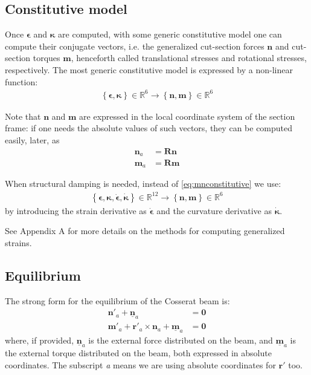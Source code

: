 \documentclass[review]{elsarticle}
\def\avect#1{{\boldsymbol{#1}}}
\def\amatr#1{{\boldsymbol{#1}}}
\begin{document}
\subsection{Constitutive model}

Once $\avect{\epsilon}$ and $\avect{\kappa}$ are computed, with some generic constitutive model one can compute their conjugate vectors, i.e. the generalized cut-section forces $\avect{n}$ and cut-section torques $\avect{m}$, henceforth called translational stresses and rotational stresses, respectively.
The most generic constitutive model is expressed by a non-linear function:
%
\begin{align}
  \left\{  
	 \avect{\epsilon},
	 \avect{\kappa}
	\right\} \in \mathbb{R}^6
	\rightarrow
	\left\{  
	 \avect{n},
	 \avect{m} 
	\right\} \in \mathbb{R}^6
\label{eq:mnconstitutive}
\end{align}

Note that $\avect{n}$ and $\avect{m}$ are expressed in the local coordinate system of the section frame: if one
needs the absolute values of such vectors, they can be computed easily, later, as 
\begin{align}
\avect{n}_a &= \amatr{R}\avect{n}\\ 
\avect{m}_a &= \amatr{R}\avect{m}
\end{align}

When structural damping is needed, instead of \eqref{eq:mnconstitutive} we use:
%
\begin{align}
  \left\{  
	 \avect{\epsilon},
	 \avect{\kappa},
	 \dot{\avect{\epsilon}},
	 \dot{\avect{\kappa}}
	\right\} \in \mathbb{R}^{12}
	\rightarrow
	\left\{  
	 \avect{n},
	 \avect{m} 
	\right\} \in \mathbb{R}^6
\label{eq:mnconstitutivewdamping}
\end{align}
%
by introducing the %
 strain derivative as 
$\dot{\avect{\epsilon}}$
and the curvature derivative as
$\dot{\avect{\kappa}}$.

See  Appendix A 
for more details on the methods for computing generalized strains.




\subsection{Equilibrium}

The strong form for the equilibrium of the Cosserat beam is:
%
\begin{align}
\avect{n}'_a + \underline{\avect{n}}_a &= \avect{0}\\ 
\avect{m}'_a + \avect{r}'_a \times \avect{n}_a + \underline{\avect{m}}_a &= \avect{0}
\end{align}
%
where, if provided, 
$\underline{\avect{n}}_a$ is the external force distributed on the beam, and 
$\underline{\avect{m}}_a$ is the external torque distributed on the beam, both expressed in 
absolute coordinates. The subscript \emph{a} means we are using absolute coordinates for $ \avect{r}'$ too.
\end{document}
